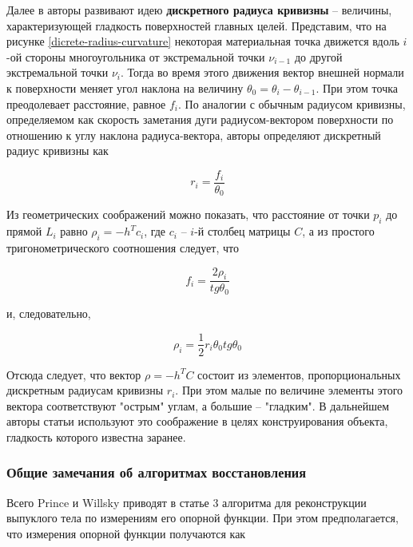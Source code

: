 \documentclass[a4paper, 12pt, titlepage]{article}
\theoremstyle{definition}
\theoremstyle{plain}
\theoremstyle{plain}
\begin{document}
Далее в авторы развивают идею \textbf{дискретного радиуса кривизны} -- величины,
характеризующей гладкость поверхностей главных целей. Представим, что на
рисунке \ref{dicrete-radius-curvature} некоторая материальная точка движется
вдоль $i$-ой стороны многоугольника от экстремальной точки $\nu_{i - 1}$ до
другой экстремальной точки $\nu_{i}$. Тогда во время этого движения вектор
внешней нормали к поверхности меняет угол наклона на величину
$\theta_{0} = \theta_{i} - \theta_{i - 1}$. При этом точка преодолевает
расстояние, равное $f_{i}$. По аналогии с обычным радиусом кривизны,
определяемом как скорость заметания дуги радиусом-вектором поверхности по
отношению к углу наклона радиуса-вектора, авторы определяют дискретный радиус
кривизны как

\begin{equation}
r_{i} = \frac{f_{i}}{\theta_{0}}
\end{equation}

Из геометрических соображений можно показать, что расстояние от точки $p_{i}$
до прямой $L_{i}$ равно $\rho_{i} = -h^{T} c_{i}$, где $c_{i}$ -- $i$-й столбец
матрицы $C$, а из простого тригонометрического соотношения следует, что

\begin{equation}
f_{i} = \frac{2 \rho_{i}}{tg \theta_{0}}
\end{equation}

и, следовательно,

\begin{equation}
\rho_{i} = \frac{1}{2} r_{i} \theta_{0} tg \theta_{0}
\end{equation}

Отсюда следует, что вектор $\rho = - h^{T} C$ состоит из элементов,
пропорциональных дискретным радиусам кривизны $r_{i}$. При этом малые по
величине элементы этого вектора соответствуют "острым" углам, а большие --
"гладким". В дальнейшем авторы статьи используют это соображение в целях
конструирования объекта, гладкость которого известна заранее.

\subsubsection{Общие замечания об алгоритмах восстановления}
\label{sec:support-methods:2d-uniform:main-notions}

Всего Prince и Willsky приводят в статье 3 алгоритма для реконструкции выпуклого
тела по измерениям его опорной функции. При этом предполагается, что измерения
опорной функции получаются как
\end{document}
